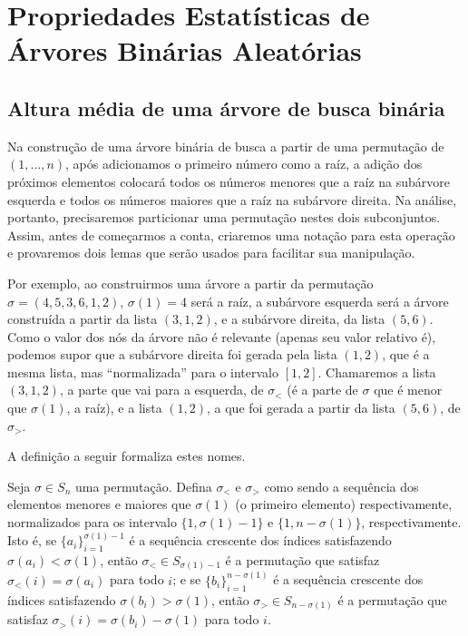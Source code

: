 \section{Propriedades Estatísticas de Árvores Binárias Aleatórias}

\subsection{Altura média de uma árvore de busca binária}

Na construção de uma árvore binária de busca
a partir de uma permutação de $(1, \dots, n)$,
após adicionamos o primeiro número como a raíz,
a adição dos próximos elementos colocará
todos os números menores que a raíz na subárvore esquerda
e todos os números maiores que a raíz na subárvore direita.
Na análise, portanto,
precisaremos particionar uma permutação nestes dois subconjuntos.
Assim,
antes de começarmos a conta,
criaremos uma notação para esta operação
e provaremos dois lemas que serão usados para facilitar sua manipulação.

Por exemplo, ao construirmos uma árvore
a partir da permutação $\sigma = (4, 5, 3, 6, 1, 2)$,
$\sigma(1) = 4$ será a raíz,
a subárvore esquerda será a árvore construída a partir da lista $(3, 1, 2)$,
e a subárvore direita, da lista $(5, 6)$.
Como o valor dos nós da árvore não é relevante (apenas seu valor relativo é),
podemos supor que a subárvore direita foi gerada pela lista $(1, 2)$,
que é a mesma lista,
mas ``normalizada'' para o intervalo $[1, 2]$.
Chamaremos a lista $(3, 1, 2)$,
a parte que vai para a esquerda, de $\sigma_<$
(é a parte de $\sigma$ que é menor que $\sigma(1)$, a raíz),
e a lista $(1, 2)$,
a que foi gerada a partir da lista $(5, 6)$, de $\sigma_>$.

A definição a seguir formaliza estes nomes.

\begin{definition}
    Seja $\sigma \in S_n$ uma permutação.
    Defina $\sigma_<$ e $\sigma_>$
    como sendo a sequência dos elementos menores e maiores que $\sigma(1)$
    (o primeiro elemento)
    respectivamente,
    normalizados para os intervalo $\{1, \sigma(1) - 1\}$ e $\{1, n - \sigma(1)\}$,
    respectivamente.
    Isto é,
    se $\{a_i\}_{i = 1}^{\sigma(1)-1}$ é a sequência crescente
    dos índices satisfazendo $\sigma(a_i) < \sigma(1)$,
    então $\sigma_< \in S_{\sigma(1) - 1}$
    é a permutação que satisfaz $\sigma_<(i) = \sigma(a_i)$ para todo $i$;
    e se $\{b_i\}_{i = 1}^{n - \sigma(1)}$ é a sequência crescente
    dos índices satisfazendo $\sigma(b_i) > \sigma(1)$,
    então $\sigma_> \in S_{n - \sigma(1)}$
    é a permutação que satisfaz $\sigma_>(i) = \sigma(b_i) - \sigma(1)$ para todo $i$.
\end{definition}

